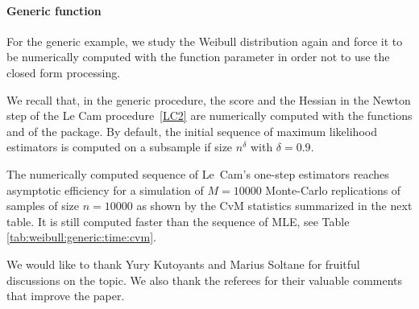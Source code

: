 


\paragraph{Generic function}

For the generic example, we study the Weibull distribution again and force it to be numerically computed with the function parameter  in order not to use the closed form processing. 

We recall that, in the generic procedure, the score and the Hessian in the Newton step of the Le Cam procedure~\eqref{LC2} are numerically computed with the functions  and  of the  package.  By default, the initial sequence of maximum likelihood estimators is computed on a subsample if size $n^\delta$ with $\delta=0.9$.


The numerically computed sequence of Le~Cam's one-step estimators reaches asymptotic efficiency for a simulation of $M=10000$ Monte-Carlo replications of samples of size $n=10000$ as shown by the CvM statistics summarized in the next table. It is still computed faster than the sequence of MLE, see Table \ref{tab:weibull:generic:time:cvm}.






%



 We would like to thank Yury Kutoyants and Marius Soltane for fruitful discussions on the topic. We also thank the referees for their valuable comments that improve the paper.




\address{Alexandre Brouste\\
  Laboratoire Manceau de Math\'ematiques, Le Mans Universit\'e\\
  Avenue Olivier Messiaen, 72085 LE MANS\\
	France\\
  ORCID: 0000-0001-6719-7432\\
  }
  

